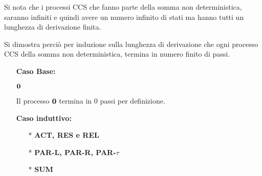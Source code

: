Si nota che i processi CCS che fanno parte della somma non deterministica, saranno infiniti e quindi avere un numero infinito di stati ma hanno tutti un lunghezza di derivazione finita.

Si dimostra perciò per induzione sulla lunghezza di derivazione che ogni processo CCS della somma non deterministica, termina in numero finito di passi.

\begin{itemize}
	\item[] \textbf{Caso Base:} \mbox{}
	
	$\mathbf{0}$
	
	Il processo $\mathbf{0}$ termina in 0 passi per definizione.
	\\
	\item[] \textbf{Caso induttivo:} \mbox{}
	\\
	\begin{itemize}
		
		\item[*] \textbf{ACT, RES e REL}
		\\
		
		\item[*] \textbf{PAR-L, PAR-R, PAR-$\tau$}
		\\
		
		\item[*] \textbf{SUM}
		\\
	\end{itemize}
\end{itemize}